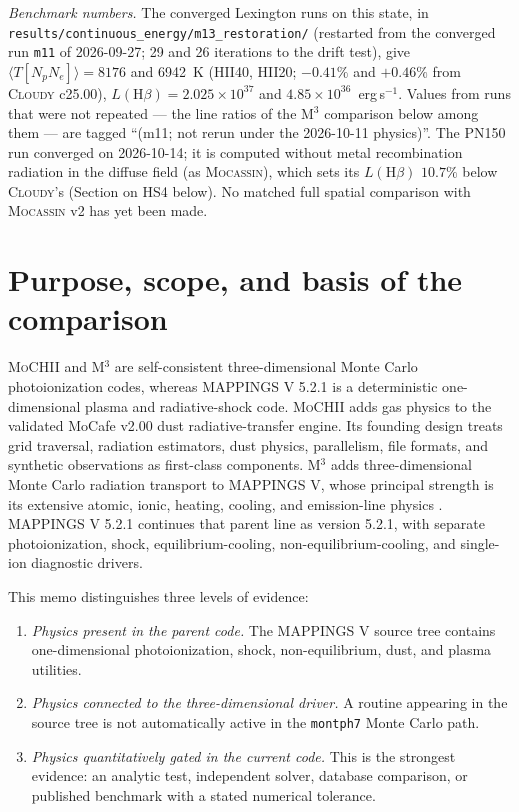 \documentclass[english,a4paper]{my_memo}
\newcommand{\code}[1]{\texttt{#1}}
\newcommand{\MoCHII}{\textsc{MoCHII}}
\newcommand{\Mthree}{M$^3$}
\newcommand{\Mappings}{MAPPINGS V 5.2.1}
\newcommand{\Mocassin}{\textsc{Mocassin}}
\newcommand{\Cloudy}{\textsc{Cloudy}}
\begin{document}
\begin{sloppypar}
\emph{Benchmark numbers.}  The converged Lexington runs on this state,
in \code{results/\allowbreak continuous\_energy/\allowbreak m13\_restoration/}
(restarted from the converged run \code{m11} of 2026-09-27; 29 and 26
iterations to the drift test), give $\langle T[N_pN_e]\rangle = 8176$ and 6942~K
(HII40, HII20; $-0.41\%$ and $+0.46\%$ from \Cloudy{} c25.00),
$L(\mathrm{H}\beta) = 2.025\times10^{37}$ and
$4.85\times10^{36}$~erg\,s$^{-1}$.  Values from runs that were not repeated
--- the line ratios of the \Mthree{} comparison below among them --- are
tagged ``(m11; not rerun under the 2026-10-11 physics)''.  The PN150 run
converged on 2026-10-14; it is computed without metal recombination radiation in the diffuse field (as \Mocassin{}),
which sets its $L(\mathrm{H}\beta)$ $10.7\%$ below \Cloudy{}'s (Section on
HS4 below).  No matched full spatial comparison with
\Mocassin{} v2 has yet been made.
\end{sloppypar}

\section{Purpose, scope, and basis of the comparison}
\label{sec:purpose}

\MoCHII{} and \Mthree{} are self-consistent three-dimensional Monte Carlo
photoionization codes, whereas \Mappings{} is a deterministic one-dimensional
plasma and radiative-shock code.  \MoCHII{} adds gas
physics to the validated MoCafe v2.00 dust radiative-transfer engine.  Its
founding design treats grid traversal, radiation estimators, dust physics,
parallelism, file formats, and synthetic observations as first-class
components.  \Mthree{} adds three-dimensional Monte Carlo radiation
transport to MAPPINGS V, whose principal strength is its extensive atomic,
ionic, heating, cooling, and emission-line physics \cite{jin2022,sd1993}.
\Mappings{} continues that parent line as version 5.2.1, with separate
photoionization, shock, equilibrium-cooling, non-equilibrium-cooling, and
single-ion diagnostic drivers.

This memo distinguishes three levels of evidence:

\begin{enumerate}[leftmargin=2em]
\item \emph{Physics present in the parent code.}  The MAPPINGS V source
  tree contains one-dimensional photoionization, shock, non-equilibrium,
  dust, and plasma utilities.
\item \emph{Physics connected to the three-dimensional driver.}  A routine
  appearing in the source tree is not automatically active in the
  \code{montph7} Monte Carlo path.
\item \emph{Physics quantitatively gated in the current code.}  This is the
  strongest evidence: an analytic test, independent solver, database
  comparison, or published benchmark with a stated numerical tolerance.
\end{enumerate}
\end{document}
